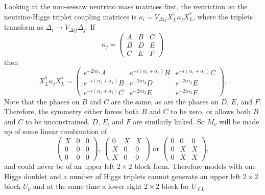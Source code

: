 \documentclass[nofootinbib,showpacs]{revtex4}
\begin{document}
Looking at the non-seesaw neutrino mass matrices first, the restriction on the neutrino-Higgs triplet coupling matrices is $\kappa_i = V_{\Delta ij} X_L^\dagger \kappa_j X_L^*$, where the triplets transform as $\Delta_i \rightarrow V_{\Delta ij}  \Delta_j$. 
If 
\begin{equation}
\kappa_j= \left(\begin{array}{ccc}A & B & C \\ B & D & E \\ C& E & F\end{array}\right)
\end{equation}
then
\begin{equation}
X_L^\dagger \kappa_j X_L^* = \left(\begin{array}{ccc}e^{-2 i \alpha_1 }A &e^{-i( \alpha_1+\alpha_2) } B & e^{-i (\alpha_1+\alpha_2) }C \\e^{-i (\alpha_1+\alpha_2) } B & e^{-2 i\alpha_2 }D &  e^{-2 i\alpha_2 }E \\ e^{-i (\alpha_1+\alpha_2) }C&  e^{-2 i\alpha_2 }E & e^{-2 i\alpha_2 } F \end{array}\right).
\end{equation}
Note that the phases on $B$ and $C$ are the same, as are the phases on $D$, $E$, and $F$. Therefore, the symmetry either forces both $B$ and $C$ to be zero, or allows both $B$ and $C$ to be unconstrained. $D$, $E$, and $F$ are similarly linked. So $M_\nu$ will be made up of some linear combination of 
\begin{equation}\label{2by2blockkappa}
\left(\begin{array}{ccc}X & 0 &0 \\ 0&0&0\\0&0&0\end{array}\right),\:
\left(\begin{array}{ccc}0&X&X\\X&0&0\\X&0&0\end{array}\right)\textrm{ or }
\left(\begin{array}{ccc}0&0&0\\0&X&X\\0&X&X\end{array}\right),
\end{equation}
and could never be of an upper left $2\times 2$ block form. Therefore models with one Higgs doublet and a number of Higgs triplets cannot generate an upper left $2\times 2$ block $U_{\nu}$ and at the same time a lower right $2\times 2$ block for $U_{\ell L}$.
\end{document}
